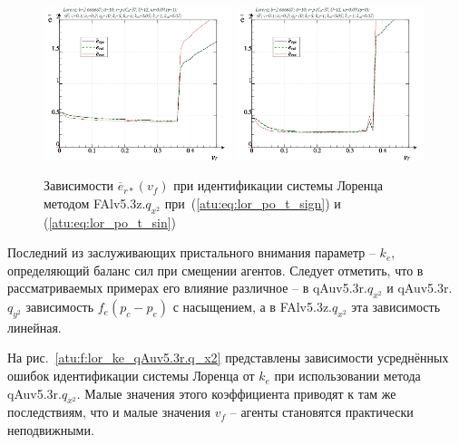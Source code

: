 \begin{figure}[h!]
  \centerline{
    \includegraphics[width=0.49\textwidth]{p/cha/lor/FAlv5.3z/lor_FAlv5_3z_qx2-p_v_f_e_sign.png}
    \hfill
    \includegraphics[width=0.49\textwidth]{p/cha/lor/FAlv5.3z/lor_FAlv5_3z_qx2-p_v_f_e_sin.png}
  }
  \caption{Зависимости $\overline{e}_{r*}(v_f)$ при идентификации системы Лоренца методом FAlv5.3z.$q_{x^2}$
   при~(\ref{atu:eq:lor_po_t_sign}) и (\ref{atu:eq:lor_po_t_sin})}
  \label{atu:f:lor_vf_FAlv5.3z.q_x2}
\end{figure}

Последний из заслуживающих пристального внимания параметр -- $k_e$,
определяющий баланс сил при смещении агентов.
Следует отметить, что в рассматриваемых примерах его влияние различное --
в qAuv5.3r.$q_{x^2}$ и qAuv5.3r.$q_{y^2}$
зависимость $f_e(p_c-p_e)$ с насыщением,
а в FAlv5.3z.$q_{x^2}$ эта зависимость линейная.

На рис.~\ref{atu:f:lor_ke_qAuv5.3r.q_x2} представлены зависимости
усреднённых ошибок идентификации системы Лоренца от $k_e$ при использовании метода qAuv5.3r.$q_{x^2}$.
Малые значения этого коэффициента приводят к там же последствиям, что и малые
значения $v_f$ -- агенты становятся практически неподвижными.

